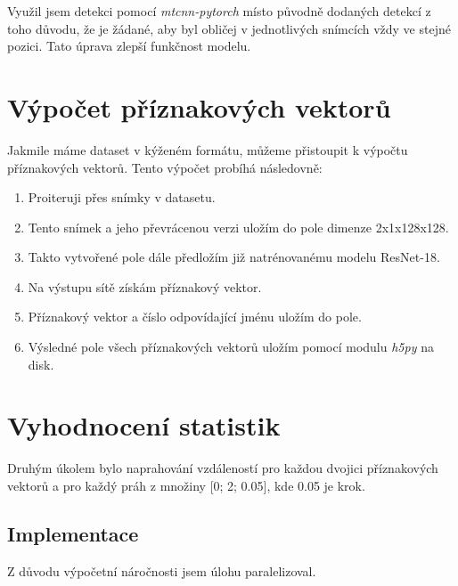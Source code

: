 \documentclass[11pt]{article}
\begin{document}
    Využil jsem detekci pomocí \textit{mtcnn-pytorch} místo původně dodaných detekcí z toho důvodu, že je žádané,
    aby byl obličej v jednotlivých snímcích vždy ve stejné pozici.
    Tato úprava zlepší funkčnost modelu.


    \section{Výpočet příznakových vektorů}\label{sec:features}
    Jakmile máme dataset v kýženém formátu, můžeme přistoupit k výpočtu příznakových vektorů.
    Tento výpočet probíhá následovně:
    \begin{enumerate}
        \item Proiteruji přes snímky v datasetu.
        \item Tento snímek a jeho převrácenou verzi uložím do pole dimenze 2x1x128x128.
        \item Takto vytvořené pole dále předložím již natrénovanému modelu ResNet-18.
        \item Na výstupu sítě získám příznakový vektor.
        \item Příznakový vektor a číslo odpovídající jménu uložím do pole.
        \item Výsledné pole všech příznakových vektorů uložím pomocí modulu \textit{h5py} na disk.
    \end{enumerate}

    \section{Vyhodnocení statistik}\label{sec:statistics}
    Druhým úkolem bylo naprahování vzdáleností pro každou dvojici příznakových vektorů a pro každý práh z množiny
    [0; 2; 0.05], kde 0.05 je krok.

    \subsection{Implementace}\label{subsec:implementaceprahovani}
    Z důvodu výpočetní náročnosti jsem úlohu paralelizoval.
\end{document}
